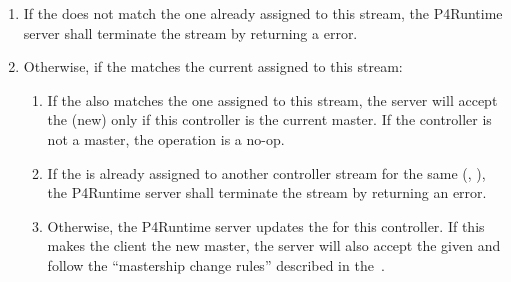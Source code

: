\documentclass[11pt]{article}
\begin{document}
{\begin{enumerate}
\begin{enumerate}%

\item{}
If the  does not match the one already assigned to this
stream, the P4Runtime server shall terminate the stream by returning a
 error.%

\item{}
Otherwise, if the  matches the current  assigned to
this stream:%

\begin{enumerate}%

\item{}
If the  also matches the one assigned to this stream,
the server will accept the (new)  only if this
controller is the current master. If the controller is not a master,
the operation is a no-op.%

\item{}
If the  is already assigned to another controller stream
for the same (, ), the P4Runtime server shall
terminate the stream by returning an  error.%

\item{}
Otherwise, the P4Runtime server updates the  for this
controller. If this makes the client the new master, the server will
also accept the given  and follow the \textquotedblleft{}mastership change
rules\textquotedblright{} described in the~.%
\end{enumerate}%


\end{enumerate}
\end{enumerate}}
\end{document}
